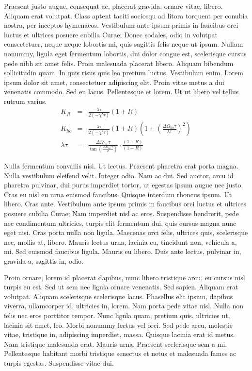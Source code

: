 \documentclass[article,colorback,accentcolor=tud4c]{tudreport}
\begin{document}
    Praesent justo augue, consequat ac, placerat gravida, ornare vitae, libero. Aliquam erat volutpat. Class aptent taciti sociosqu ad litora torquent per conubia nostra, per inceptos hymenaeos. Vestibulum ante ipsum primis in faucibus orci luctus et ultrices posuere cubilia Curae; Donec sodales, odio in volutpat consectetuer, neque neque lobortis mi, quis sagittis felis neque ut ipsum. Nullam nonummy, ligula eget fermentum lobortis, dui dolor congue est, scelerisque cursus pede nibh sit amet felis. Proin malesuada placerat libero. Aliquam bibendum sollicitudin quam. In quis risus quis leo pretium luctus. Vestibulum enim. Lorem ipsum dolor sit amet, consectetuer adipiscing elit. Proin vitae metus a dui venenatis commodo. Sed eu lacus. Pellentesque et lorem. Ut ut libero vel tellus rutrum varius.
			\begin{eqnarray}
				K_{fl}&=&\frac{\lambda\tau}{2(-\chi'\tau)}(1+R)\\
				K_{ho}&=&\frac{\lambda\tau}{2(-\chi'\tau)}(1+R)
					\left(1+\left(\frac{\Delta\Omega_{ho}\tau}{\lambda\tau}\right)^2\right)
					\\
				\lambda\tau&=&
					\frac{\Delta\Omega_{ho}\,\tau}{\tan\left(\frac{\Delta\Omega_{ho}\,\tau}{2}
					\right)}\cdot\frac{(1+R)}{(1-R)}
			\end{eqnarray}

    Nulla fermentum convallis nisi. Ut lectus. Praesent pharetra erat porta magna. Nulla vestibulum eleifend velit. Integer odio. Nam ac dui. Sed auctor, arcu id pharetra pulvinar, dui purus imperdiet tortor, ut egestas ipsum augue nec justo. Cras eu nisl eu urna euismod faucibus. Quisque interdum rhoncus ipsum. Ut libero. Cras ante. Vestibulum ante ipsum primis in faucibus orci luctus et ultrices posuere cubilia Curae; Nam imperdiet nisl ac eros. Suspendisse hendrerit, pede nec condimentum ultricies, turpis elit fermentum dui, quis cursus magna nunc eget nisi. Cras porta nulla non ligula. Maecenas orci felis, ultrices quis, scelerisque nec, mollis at, libero. Mauris lectus urna, lacinia eu, tincidunt non, vehicula a, mi. Sed euismod faucibus ligula. Mauris eu libero. Duis ante lectus, pulvinar in, gravida a, sagittis in, odio.

    Proin ornare, lorem id placerat dapibus, nunc libero tristique arcu, eu cursus nisl turpis eu est. Sed ut sem nec ligula ornare venenatis. Sed sapien. Aliquam erat volutpat. Aliquam scelerisque scelerisque lacus. Phasellus elit ipsum, dapibus viverra, ullamcorper id, ultricies in, lorem. Nam porta pede vitae nisl. Nulla non felis nec eros porttitor tempor. Nunc ligula quam, pretium quis, ultricies ut, lacinia sit amet, leo. Morbi nonummy lectus vel orci. Sed pede arcu, molestie vitae, tristique in, adipiscing imperdiet, massa. Quisque lacinia erat id metus. Nam tristique malesuada erat. Mauris urna. Praesent scelerisque sem a mi. Pellentesque habitant morbi tristique senectus et netus et malesuada fames ac turpis egestas. Suspendisse vitae dui.
\end{document}
